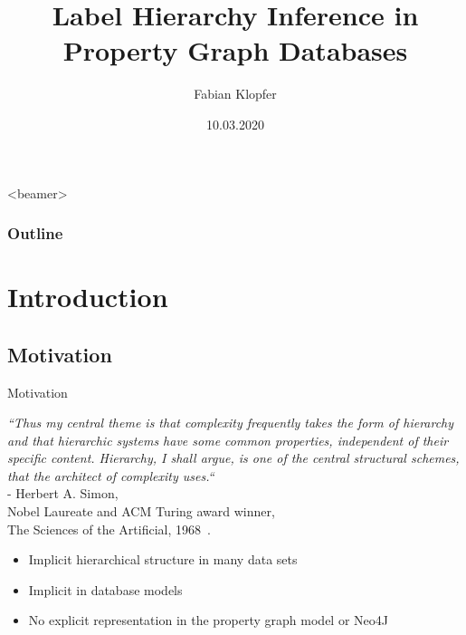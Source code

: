 \documentclass[rgb]{beamer}
\title{Label Hierarchy Inference in Property Graph Databases}
\author{Fabian Klopfer}
\date{10.03.2020}
\institute{Databases and Information Systems Group \\ University of Konstanz}
\begin{document}
  \begin{frame}<beamer>
    \frametitle{Outline}
    \tableofcontents[subsectionstyle=hide]
  \end{frame}
  
\section{Introduction}
    \subsection{Motivation}
    \begin{frame}{Motivation}
        \begin{center}
            \textit{``Thus my central theme is that complexity frequently takes the form of hierarchy and that hierarchic systems have some common properties, independent of their specific content. Hierarchy, I shall argue, is one of the central structural schemes, that the architect of complexity uses.``} \\
            \vspace{0.3cm}
            - Herbert A. Simon, \\
            Nobel Laureate and ACM Turing award winner, \\
            The Sciences of the Artificial, 1968~\cite{simon2019sciences}. \\
        \end{center}{}
        \vspace{1.5cm}
        \begin{itemize}
            \item Implicit hierarchical structure in many data sets
            \item Implicit in database models
            \item No explicit representation in the property graph model or Neo4J
        \end{itemize}        
    \end{frame}
    
\end{document}

